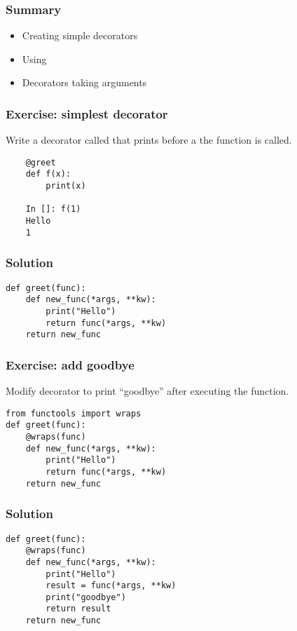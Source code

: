 \documentclass[14pt,compress,aspectratio=169]{beamer}
\begin{document}
\begin{frame}
  \frametitle{Summary}
  \begin{itemize}
  \item Creating simple decorators
  \item Using 
  \item Decorators taking arguments
  \end{itemize}
\end{frame}

\begin{frame}
  \frametitle{Exercise: simplest decorator}
  \begin{block}{}
    Write a decorator called  that prints  before a
    the function is called.
  \end{block}
  \begin{lstlisting}
    @greet
    def f(x):
        print(x)

    In []: f(1)
    Hello
    1
\end{lstlisting}
\end{frame}


\begin{frame}
  \frametitle{Solution}
\begin{lstlisting}
def greet(func):
    def new_func(*args, **kw):
        print("Hello")
        return func(*args, **kw)
    return new_func
\end{lstlisting}
\end{frame}

\begin{frame}
  \frametitle{Exercise: add goodbye}
  \begin{block}{}
    Modify decorator  to print ``goodbye'' after executing the
    function.
  \end{block}
  \begin{lstlisting}
from functools import wraps
def greet(func):
    @wraps(func)
    def new_func(*args, **kw):
        print("Hello")
        return func(*args, **kw)
    return new_func
\end{lstlisting}

\end{frame}

\begin{frame}[fragile]
  \frametitle{Solution}
\begin{lstlisting}
def greet(func):
    @wraps(func)
    def new_func(*args, **kw):
        print("Hello")
        result = func(*args, **kw)
        print("goodbye")
        return result
    return new_func
\end{lstlisting}
\end{frame}
\end{document}
